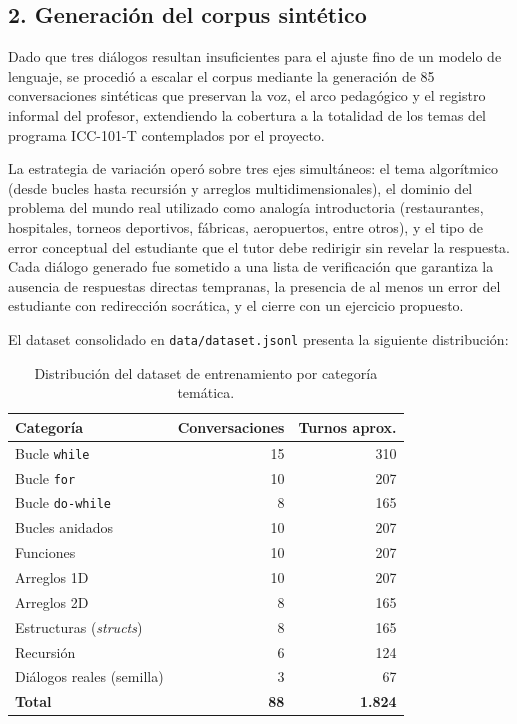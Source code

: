 \documentclass[12pt]{article}
\begin{document}
\subsection*{2. Generación del corpus sintético}

Dado que tres diálogos resultan insuficientes para el ajuste fino de un modelo
de lenguaje, se procedió a escalar el corpus mediante la generación de 85
conversaciones sintéticas que preservan la voz, el arco pedagógico y el
registro informal del profesor, extendiendo la cobertura a la totalidad de los
temas del programa ICC-101-T contemplados por el proyecto.

La estrategia de variación operó sobre tres ejes simultáneos: el tema
algorítmico (desde bucles hasta recursión y arreglos multidimensionales), el
dominio del problema del mundo real utilizado como analogía introductoria
(restaurantes, hospitales, torneos deportivos, fábricas, aeropuertos, entre
otros), y el tipo de error conceptual del estudiante que el tutor debe
redirigir sin revelar la respuesta. Cada diálogo generado fue sometido a una
lista de verificación que garantiza la ausencia de respuestas directas
tempranas, la presencia de al menos un error del estudiante con redirección
socrática, y el cierre con un ejercicio propuesto.

El dataset consolidado en \texttt{data/dataset.jsonl} presenta la siguiente
distribución:

\begin{table}[H]
    \centering
    \begin{tabular}{lrr}
        \toprule
        \textbf{Categoría} & \textbf{Conversaciones} & \textbf{Turnos aprox.} \\
        \midrule
        Bucle \texttt{while}       & 15 & 310 \\
        Bucle \texttt{for}         & 10 & 207 \\
        Bucle \texttt{do-while}    &  8 & 165 \\
        Bucles anidados            & 10 & 207 \\
        Funciones                  & 10 & 207 \\
        Arreglos 1D                & 10 & 207 \\
        Arreglos 2D                &  8 & 165 \\
        Estructuras (\textit{structs}) & 8 & 165 \\
        Recursión                  &  6 & 124 \\
        Diálogos reales (semilla)  &  3 &  67 \\
        \midrule
        \textbf{Total}             & \textbf{88} & \textbf{1.824} \\
        \bottomrule
    \end{tabular}
    \caption{Distribución del dataset de entrenamiento por categoría temática.}
\end{table}
\end{document}
